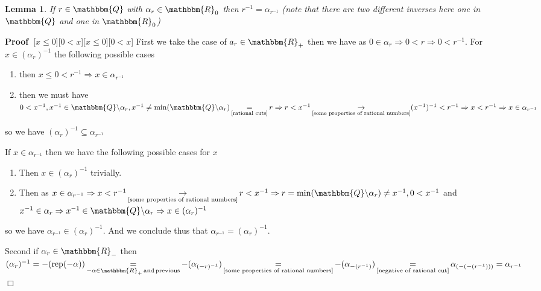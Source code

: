 \documentclass{book}
\newcommand{\Rightarrowlim}{\mathop{\rightarrow}\limits}
\newcommand{\equallim}{\mathop{=}\limits}
\newcommand{\tmop}[1]{\ensuremath{\operatorname{#1}}}
\newcommand{\um}{-}
\newenvironment{proof}{\noindent\textbf{Proof\ }}{\hspace*{\fill}$\Box$\medskip}
\newtheorem{lemma}{Lemma}
\begin{document}
{{\begin{lemma}
  \label{inverse of element in Q in R}If $r \in \mathbbm{Q}$ with $\alpha_r
  \in \mathbbm{R}_0$ then $r^{- 1} = \alpha_{r^{- 1}}$ (note that there are
  two different inverses here one in $\mathbbm{Q}$ and one in $\mathbbm{R}_0$)
\end{lemma}

\begin{proof}[$x \leqslant 0$][$0 < x$][$x \leqslant 0$][$0 < x$]
  First we take the case of $a_r \in \mathbbm{R}_+$ then we have as $0 \in
  \alpha_r \Rightarrow 0 < r \Rightarrow 0 < r^{- 1}$. For $x \in
  (\alpha_r)^{- 1}$ the following possible cases
  \begin{enumerate}
    \item then $x \leqslant 0 < r^{- 1} \Rightarrow x \in \alpha_{r^{- 1}}$
    
    \item then we must have $0 < x^{- 1}, x^{- 1} \in \mathbbm{Q} \backslash
    \alpha_r, x^{- 1} \neq \min (\mathbbm{Q} \backslash \alpha_r)
    \equallim_{\text{\ref{rational cuts}}} r \Rightarrow r < x^{- 1}
    \Rightarrowlim_{\text{\ref{some properties of rational numbers}}} (x^{-
    1})^{- 1} < r^{- 1} \Rightarrow x < r^{- 1} \Rightarrow x \in \alpha_{r^{-
    1}}$
  \end{enumerate}
  so we have $(\alpha_r)^{- 1} \subseteq \alpha_{r^{- 1}}$
  
  If $x \in \alpha_{r^{- 1}}$ then we have the following possible cases for
  $x$
  \begin{enumerate}
    \item Then $x \in (\alpha_r)^{- 1}$ trivially.
    
    \item Then as $x \in \alpha_{r^{- 1}} \Rightarrow x < r^{- 1}
    \Rightarrowlim_{\text{\ref{some properties of rational numbers}}} r < x^{-
    1} \Rightarrow r = \min (\mathbbm{Q} \backslash \alpha_r) \neq x^{- 1}, 0
    < x^{- 1}$ and $x^{- 1} \in \alpha_r \Rightarrow x^{- 1} \in \mathbbm{Q}
    \backslash \alpha_r \Rightarrow x \in (\alpha_r)^{- 1}$
  \end{enumerate}
  so we have $\alpha_{r^{- 1}} \in (\alpha_r)^{- 1}$. And we conclude thus
  that $\alpha_{r^{- 1}} = (\alpha_r)^{- 1}$.
  
  Second if $\alpha_r \in \mathbbm{R}_-$ then $(\alpha_r)^{- 1} = -
  (\tmop{rep} (\um \alpha)) \equallim_{- \alpha \in \mathbbm{R}_+ \tmop{and}
  \tmop{previous}} - (\alpha_{(- r)^{- 1}}) \equallim_{\text{\ref{some
  properties of rational numbers}}} - (\alpha_{- (r^{- 1})})
  \equallim_{\text{\ref{negative of rational cut}}} \alpha_{(- (- (r^{- 1})))}
  = \alpha_{r^{- 1}}$
\end{proof}

}}
\end{document}
